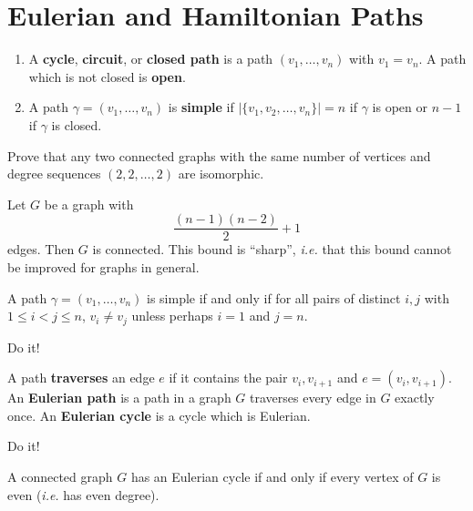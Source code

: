 \section{Eulerian and Hamiltonian Paths}\label{sec:euler}
\begin{definition}\leavevmode
\begin{enumerate}
    \item A \textbf{cycle}, \textbf{circuit}, or \textbf{closed path} is a path $(v_1, \ldots, v_n)$ with $v_1 = v_n$. A path which is not closed is \textbf{open}.
    \item A path $\gamma = (v_1, \ldots, v_n)$ is \textbf{simple} if $|\{v_1, v_2, \ldots, v_n\}| = n$ if $\gamma$ is open or $n-1$ if $\gamma$ is closed.
\end{enumerate}
\end{definition}

\begin{exercise} Prove that any two connected graphs with the same number of vertices and degree sequences $(2, 2, \ldots, 2)$ are isomorphic.
\end{exercise}

\begin{theorem} Let $G$ be a graph with
$$\frac{(n-1)(n-2)}{2} +1$$
edges.  Then $G$ is connected.  This bound is ``sharp'', \textit{i.e.} that this bound cannot be improved for graphs in general.
\end{theorem}

\begin{theorem} A path $\gamma= (v_1, \ldots, v_n)$ is simple if and only if for all pairs of distinct $i, j$ with $1\leq i < j\leq n$, $v_i \neq v_j$ unless perhaps $i=1$ and $j=n$.
\end{theorem}

\begin{examples} Do it!
\end{examples}

\begin{definition} A path \textbf{traverses} an edge $e$ if it contains the pair $v_i, v_{i+1}$ and $e=(v_i, v_{i+1})$. An \textbf{Eulerian path} is a path in a graph $G$ traverses every edge in $G$ exactly once.  An \textbf{Eulerian cycle} is a cycle which is Eulerian.
\end{definition}

\begin{examples} Do it!
\end{examples}

\begin{theorem} A connected graph $G$ has an Eulerian cycle if and only if every vertex of $G$ is even (\textit{i.e.} has even degree).
\end{theorem}


